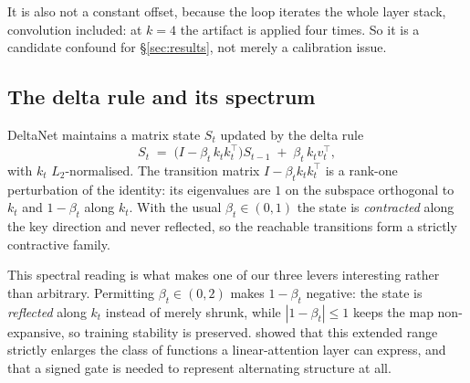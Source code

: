 It is also not a constant offset, because the loop iterates the whole layer
stack, convolution included: at $k{=}4$ the artifact is applied four times. So
it is a candidate confound for \S\ref{sec:results}, not merely a calibration
issue.


\subsection{The delta rule and its spectrum}

DeltaNet maintains a matrix state $S_t$ updated by the delta rule
\begin{equation}
  S_t \;=\; \bigl(I - \beta_t\, k_t k_t^{\!\top}\bigr) S_{t-1}
          \;+\; \beta_t\, k_t v_t^{\!\top},
  \label{eq:deltarule}
\end{equation}
with $k_t$ $L_2$-normalised. The transition matrix
$I - \beta_t k_t k_t^{\!\top}$ is a rank-one perturbation of the identity: its
eigenvalues are $1$ on the subspace orthogonal to $k_t$ and $1-\beta_t$ along
$k_t$. With the usual $\beta_t \in (0,1)$ the state is \emph{contracted} along
the key direction and never reflected, so the reachable transitions form a
strictly contractive family.

This spectral reading is what makes one of our three levers interesting rather
than arbitrary. Permitting $\beta_t \in (0,2)$ makes $1-\beta_t$ negative: the
state is \emph{reflected} along $k_t$ instead of merely shrunk, while
$|1-\beta_t|\le 1$ keeps the map non-expansive, so training stability is
preserved. \citet{grazzi2025unlocking} showed that this extended range strictly
enlarges the class of functions a linear-attention layer can express, and
\citet{sarrof2024expressive} that a signed gate is needed to represent
alternating structure at all.

